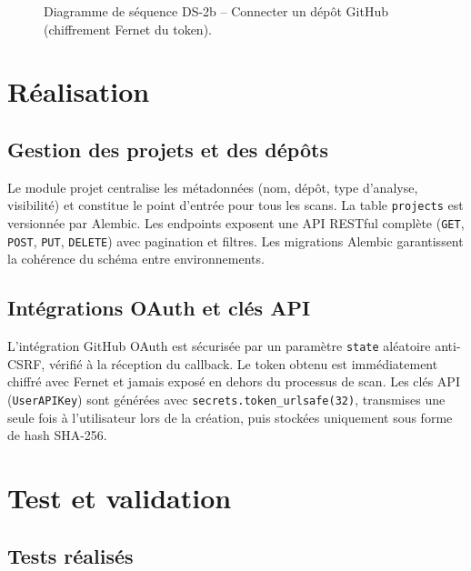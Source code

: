 \begin{figure}[H]
\centering
\fbox{\rule{0pt}{2in}\rule{0.9\linewidth}{0pt}}
\caption{Diagramme de séquence DS-2b -- Connecter un dépôt GitHub (chiffrement Fernet du token).}
\label{fig:sprint2-seq-github}
\end{figure}

\section{Réalisation}

\subsection{Gestion des projets et des dépôts}
Le module projet centralise les métadonnées (nom, dépôt, type d'analyse, visibilité) et constitue le point d'entrée pour tous les scans. La table \texttt{projects} est versionnée par Alembic. Les endpoints exposent une API RESTful complète (\texttt{GET}, \texttt{POST}, \texttt{PUT}, \texttt{DELETE}) avec pagination et filtres. Les migrations Alembic garantissent la cohérence du schéma entre environnements.

\subsection{Intégrations OAuth et clés API}
L'intégration GitHub OAuth est sécurisée par un paramètre \texttt{state} aléatoire anti-CSRF, vérifié à la réception du callback. Le token obtenu est immédiatement chiffré avec Fernet et jamais exposé en dehors du processus de scan. Les clés API (\texttt{UserAPIKey}) sont générées avec \texttt{secrets.token\_urlsafe(32)}, transmises une seule fois à l'utilisateur lors de la création, puis stockées uniquement sous forme de hash SHA-256.

\section{Test et validation}

\subsection{Tests réalisés}


